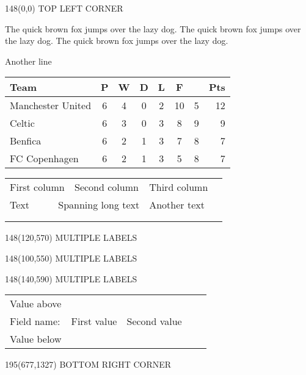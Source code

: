 \documentclass{article}
\begin{document}
\begin{textblock}{148}(0,0)
\noindent
TOP LEFT CORNER
\end{textblock}

The quick brown fox jumps over the lazy dog. The quick brown fox jumps over the lazy dog. The quick brown fox jumps over the lazy dog.

Another line

\vspace{10 mm}
\begin{tabular}{l*{6}{c}r}
Team              & P & W & D & L & F  &   & Pts \\
\hline
Manchester United & 6 & 4 & 0 & 2 & 10 & 5 & 12  \\
Celtic            & 6 & 3 & 0 & 3 &  8 & 9 &  9  \\
Benfica           & 6 & 2 & 1 & 3 &  7 & 8 &  7  \\
FC Copenhagen     & 6 & 2 & 1 & 3 &  5 & 8 &  7  \\
\end{tabular}

\vspace{10 mm}
\begin{table}[h]
\begin{tabular}{lllll}
\multicolumn{2}{l}{First column}      & Second column      & Third column &  \\
Text              & \multicolumn{2}{l}{Spanning long text} & Another text &  \\
                  &                   &                    &              &  \\
                  &                   &                    &              & 
\end{tabular}
\end{table}

\begin{textblock}{148}(120,570)
\noindent
MULTIPLE LABELS
\end{textblock}

\begin{textblock}{148}(100,550)
\noindent
MULTIPLE LABELS
\end{textblock}

\begin{textblock}{148}(140,590)
\noindent
MULTIPLE LABELS
\end{textblock}

\vspace{10 mm}
\begin{table}[h]
\begin{tabular}{lllll}
Value above &             &              &  &  \\
Field name: & First value & Second value &  &  \\
Value below &             &              &  & 
\end{tabular}
\end{table}

\begin{textblock}{195}(677,1327)
\noindent
BOTTOM RIGHT CORNER
\end{textblock}
\end{document}
